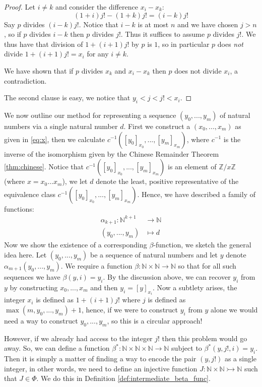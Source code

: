 \documentclass[12pt]{article}
\theoremstyle{plain}
\theoremstyle{definition}
\newcommand{\bb}[1]{\mathbb{#1}}
\newcommand{\lto}{\longrightarrow}
\begin{document}
	\begin{proof}
		Let $i \neq k$ and consider the difference $x_i - x_k$:
		\begin{equation}
			(1 + i)j! - (1 + k)j! = (i - k)j!
		\end{equation}
		Say $p$ divides $(i - k)j!$. Notice that $i - k$ is at most $n$ and we have chosen $j > n$, so if $p$ divides $i - k$ then $p$ divides $j!$. Thus it suffices to assume $p$ divides $j!$. We thus have that division of $1 + (i+1)j!$ by $p$ is $1$, so in particular $p$ does \emph{not} divide $1 + (i+1)j! = x_i$ for any $i \neq k$.
		
		We have shown that if $p$ divides $x_k$ and $x_i - x_k$ then $p$ does not divide $x_i$, a contradiction.
		
		The second clause is easy, we notice that $y_i < j < j! < x_i$.
	\end{proof}
	We now outline our method for representing a sequence $(y_0,...,y_m)$ of natural numbers via a single natural number $d$. First we construct a $(x_0,...,x_m)$ as given in \eqref{eq:x}, then we calculate $c^{-1}([y_0]_{x_0},...,[y_m]_{x_m})$, where $c^{-1}$ is the inverse of the isomorphism given by the Chinese Remainder Theorem \ref{thm:chinese}. Notice that $c^{-1}([y_0]_{x_0},...,[y_m]_{x_m})$ is an element of $\bb{Z}/x\bb{Z}$ (where $x = x_0 \hdots x_m$), we let $d$ denote the least, positive representative of the equivalence class $c^{-1}([y_0]_{x_0},...,[y_m]_{x_m})$. Hence, we have described a family of functions:
	\begin{align}
		\alpha_{k+1}: \bb{N}^{k+1} &\lto \bb{N}\\
		(y_0,...,y_m) &\longmapsto d
	\end{align}
	Now we show the existence of a corresponding $\beta$-function, we sketch the general idea here. Let $(y_0,...,y_m)$ be a sequence of natural numbers and let $y$ denote $\alpha_{m+1}(y_0,...,y_m)$. We require a function $\beta: \bb{N} \times \bb{N} \lto \bb{N}$ so that for all such sequences we have $\beta(y,i) = y_i$. By the discussion above, we can recover $y_i$ from $y$ by constructing $x_0,...,x_m$ and then $y_i = [y]_{x_i}$. Now a subtlety arises, the integer $x_i$ is defined as $1 + (i + 1)j!$ where $j$ is defined as $\operatorname{max}(m,y_0,...,y_m) + 1$, hence, if we were to construct $y_i$ from $y$ alone we would need a way to construct $y_0,...,y_m$, so this is a circular approach!
	
	However, if we already had access to the integer $j!$ then this problem would go away. So, we can define a function $\beta^*: \bb{N} \times \bb{N} \times \bb{N} \lto \bb{N}$ subject to $\beta^\ast(y,j!,i) = y_i$. Then it is simply a matter of finding a way to encode the pair $(y,j!)$ as a single integer, in other words, we need to define an injective function $J:\bb{N} \times \bb{N} \rightarrowtail \bb{N}$ such that $J \in \Phi$. We do this in Definition \ref{def:intermediate_beta_func}.
	
\end{document}
